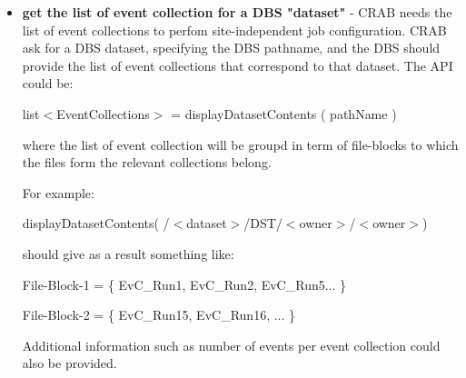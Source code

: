 \documentclass[pdftex]{cmspaper}
\begin{document}
{\begin{itemize}
\begin{center}
    \mbox{/$<$dataset$>$/Hit/$<$Hitowner$>$/$<$Hitowner$>$}
\end{center}
\begin{center}
     \mbox{/$<$dataset$>$/Digi/$<$Digiowner$>$/$<$Digiowner$>$}
\end{center}
\begin{center}
     \mbox{/$<$dataset$>$/DST/$<$owner$>$/$<$owner$>$}
\end{center}

{\bf FIXME:} The DBS should track provenance at the level of the indivual 
event collections and not at the level of datasets. However the current
DBS schema allow to track provenance between datasets. In the context 
of the old EDM is easier to think in term of dataset provenance 
and it might be worth start with this concept at the beginning (keeping in mind
to fix that later).

\item {\bf get the list of event collection for a DBS "dataset"} - 
 CRAB needs the list of event collections to perfom site-independent 
 job configuration. CRAB ask for a DBS dataset, specifying the DBS pathname, 
 and the DBS should provide the list of event collections that correspond 
 to that dataset. 
 The API could be:

\begin{center}
  list$<$EventCollections$>$ = displayDatasetContents ( pathName )
\end{center}

 where the list of event collection will be groupd in term of file-blocks
 to which the files form the relevant collections belong.

 For example:
 \begin{center}
   displayDatasetContents( /$<$dataset$>$/DST/$<$owner$>$/$<$owner$>$)
 \end{center}
 should give as a result something like:

\begin{flushleft}
\mbox{File-Block-1} = \{ \mbox{EvC\_Run1}, \mbox{EvC\_Run2}, \mbox{EvC\_Run5}... \}
\end{flushleft}
\begin{flushleft}
\mbox{File-Block-2} = \{ \mbox{EvC\_Run15}, \mbox{EvC\_Run16}, ... \}
\end{flushleft}


 Additional information such as number of events per event collection
 could also be provided.


\end{itemize}}
\end{document}
